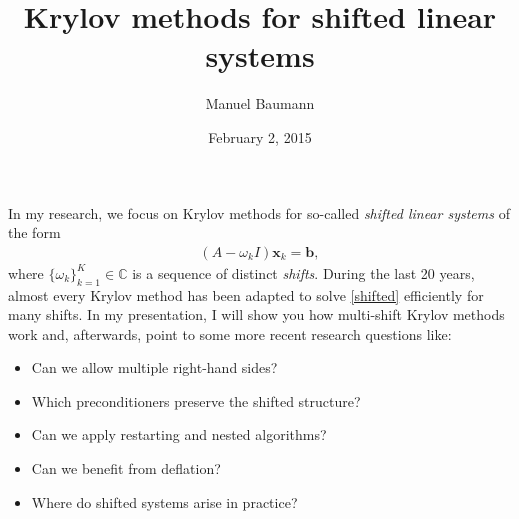 \documentclass{article}
\title{Krylov methods for shifted linear systems}
\author{Manuel Baumann}
\affil{PhD student at TU Delft}
\date{February 2, 2015}
\begin{document}
\maketitle
\setcounter{page}{4}
In my research, we focus on Krylov methods for so-called \textit{shifted linear systems} of the form
\begin{align}
\label{shifted}
 (A - \omega_k I) \mathbf{x}_k = \mathbf{b},
\end{align}
where $\{\omega_k\}_{k=1}^K \in \mathbb{C}$ is a sequence of distinct \textit{shifts}. During the last 20 years, almost every Krylov method has been adapted to solve \eqref{shifted} efficiently for many shifts. In my presentation, I will show you how multi-shift Krylov methods work and, afterwards, point to some more recent research questions like:
\begin{itemize}
 \item Can we allow multiple right-hand sides?
 \item Which preconditioners preserve the shifted structure?
 \item Can we apply restarting and nested algorithms?
 \item Can we benefit from deflation?
 \item Where do shifted systems arise in practice?
\end{itemize}
\end{document}
